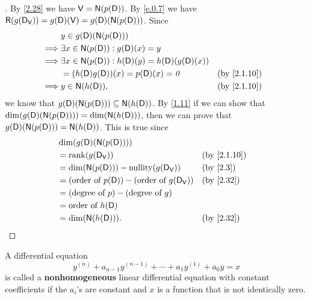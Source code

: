 \begin{proof}[]
  By \cref{2.28} we have \(\V = \ns{p(\Dop)}\).
  By \cref{e.0.7} we have \(\rg{g(\Dop_{\V})} = g(\Dop)(\V) = g(\Dop)(\ns{p(\Dop)})\).
  Since
  \begin{align*}
             & y \in g(\Dop)(\ns{p(\Dop)})                                                                  \\
    \implies & \exists x \in \ns{p(\Dop)} : g(\Dop)(x) = y                                                  \\
    \implies & \exists x \in \ns{p(\Dop)} : h(\Dop)(y) = h(\Dop)(g(\Dop)(x))                                \\
             & = (h(\Dop) g(\Dop))(x) = p(\Dop)(x) = \zv                     &  & \text{(by \cref{2.1.10})} \\
    \implies & y \in \ns{h(\Dop)},                                           &  & \text{(by \cref{2.1.10})}
  \end{align*}
  we know that \(g(\Dop)(\ns{p(\Dop)}) \subseteq \ns{h(\Dop)}\).
  By \cref{1.11} if we can show that \(\dim(g(\Dop)(\ns{p(\Dop)})) = \dim(\ns{h(\Dop)})\), then we can prove that \(g(\Dop)(\ns{p(\Dop)}) = \ns{h(\Dop)}\).
  This is true since
  \begin{align*}
     & \dim(g(\Dop)(\ns{p(\Dop)}))                                                                   \\
     & = \rk{g(\Dop_{\V})}                                            &  & \text{(by \cref{2.1.10})} \\
     & = \dim(\ns{p(\Dop)}) - \nt{g(\Dop_{\V})}                       &  & \text{(by \cref{2.3})}    \\
     & = (\text{order of } p(\Dop)) - (\text{order of } g(\Dop_{\V})) &  & \text{(by \cref{2.32})}   \\
     & = (\text{degree of } p) - (\text{degree of } g)                                               \\
     & = \text{order of } h(\Dop)                                                                    \\
     & = \dim(\ns{h(\Dop)}).                                          &  & \text{(by \cref{2.32})}
  \end{align*}
\end{proof}

\begin{defn}\label{2.7.16}
  A differential equation
  \[
    y^{(n)} + a_{n - 1} y^{(n - 1)} + \cdots + a_1 y^{(1)} + a_0 y = x
  \]
  is called a \textbf{nonhomogeneous} linear differential equation with constant coefficients if the \(a_i\)'s are constant and \(x\) is a function that is not identically zero.
\end{defn}

